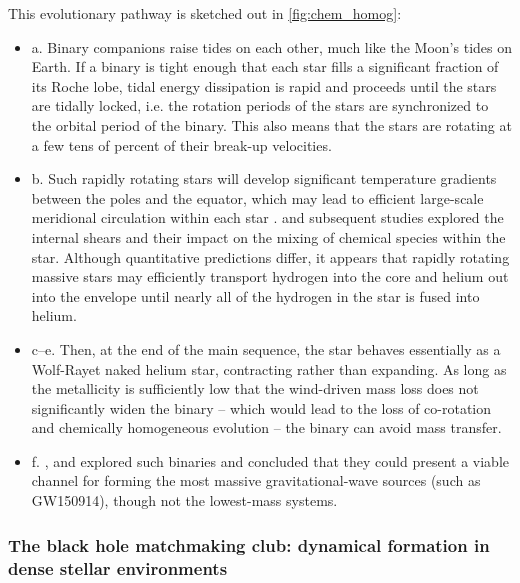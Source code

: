 \documentclass[iop,onecolumn]{revtex4}
\begin{document}
This evolutionary pathway is sketched out in \autoref{fig:chem_homog}:
\begin{itemize}
\item{a.} Binary companions raise tides on each other, much like the Moon's tides on Earth.  If a binary is tight enough that each star fills a significant fraction of its Roche lobe, tidal energy dissipation is rapid and proceeds until the stars are tidally locked, i.e. the rotation periods of the stars are synchronized to the orbital period of the binary. This also means that the stars are rotating at a few tens of percent of their break-up velocities.  
\item{b.} Such rapidly rotating stars will develop significant temperature gradients between the poles and the equator, which may lead to efficient large-scale meridional circulation within each star \citep{Eddington:1925,Sweet:1950}.  \citet{EndalSofia:1978} and subsequent studies \citep[e.g.,][]{Heger:2000,MaederMeynet:2000,Yoon:2006} explored the internal shears and their impact on the mixing of chemical species within the star.  Although quantitative predictions differ, it appears that rapidly rotating massive stars may efficiently transport hydrogen into the core and helium out into the envelope until nearly all of the hydrogen in the star is fused into helium.  
\item{c--e.} Then, at the end of the main sequence, the star behaves essentially as a Wolf-Rayet naked helium star, contracting rather than expanding. As long as the metallicity is sufficiently low that the wind-driven mass loss does not significantly widen the binary -- which would lead to the loss of co-rotation and chemically homogeneous evolution \citep{deMink:2009} -- the binary can avoid mass transfer.  
\item{f.} \citet{MandeldeMink:2016,deMinkMandel:2016}, and \citet{Marchant:2016} explored such binaries and concluded that they could present a viable channel for forming the most massive gravitational-wave sources (such as GW150914), though not the lowest-mass systems.  
\end{itemize}

\subsubsection{The black hole matchmaking club: dynamical formation in dense stellar environments}
\end{document}
